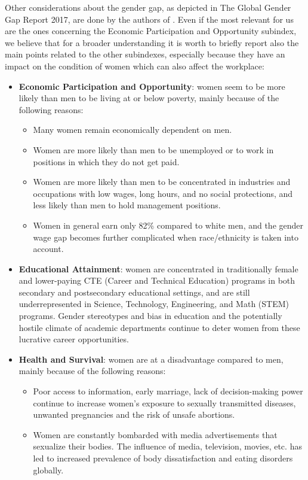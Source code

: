 Other considerations about the gender gap, as depicted in The Global Gender Gap Report 2017, are done by the authors of \cite{hazel2019gender}. Even if the most relevant for us are the ones concerning the Economic Participation and Opportunity subindex, we believe that for a broader understanding it is worth to briefly report also the main points related to the other subindexes, especially because they have an impact on the condition of women which can also affect the workplace:
\begin{itemize}
\item \textbf{Economic Participation and Opportunity}: women seem to be more likely than men to be living at or below poverty, mainly because of the following reasons:
\begin{itemize}
\item Many women remain economically dependent on men.
\item Women are more likely than men to be unemployed or to work in positions in which they do not get paid.
\item Women are more likely than men to be concentrated in industries and occupations with low wages, long hours, and no social protections, and less likely than men to hold management positions.
\item Women in general earn only 82\% compared to white men, and the gender wage gap becomes further complicated when race/ethnicity is taken into account.
\end{itemize}
\item \textbf{Educational Attainment}: women are concentrated in traditionally female and lower-paying CTE (Career and Technical Education) programs in both secondary and postsecondary educational settings, and are still underrepresented in Science, Technology, Engineering, and Math (STEM) programs. Gender stereotypes and bias in education and the potentially hostile climate of academic departments continue to deter women from these lucrative career opportunities.
\item \textbf{Health and Survival}: women are at a disadvantage compared to men, mainly because of the following reasons:
\begin{itemize}
\item Poor access to information, early marriage, lack of decision-making power continue to increase women's exposure to sexually transmitted diseases, unwanted pregnancies and the risk of unsafe abortions.
\item Women are constantly bombarded with media advertisements that sexualize their bodies. The influence of media, television, movies, etc. has led to increased prevalence of body dissatisfaction and eating disorders globally.

\end{itemize}
\end{itemize}
